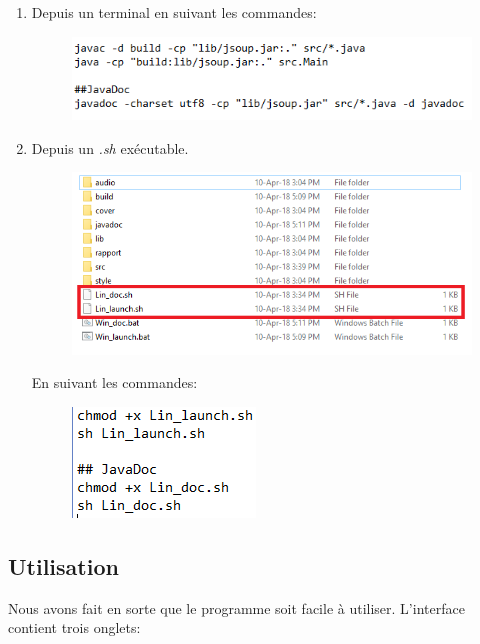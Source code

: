 \documentclass[a4paper,12pt]{report} %
\begin{document}
	\begin{enumerate}
   		\item Depuis un terminal en suivant les commandes:
   			\begin{figure}[ht] 		
				\centering
  				\includegraphics{exe_terminal}
			\end{figure}
			
   		\item Depuis un \textit{.sh} exécutable.
   			\begin{figure}[ht] 		
				\centering
  				\includegraphics[scale=0.7]{sh}
			\end{figure} 
			
			En suivant les commandes: 
			\begin{figure}[ht] 		
				\centering
  				\includegraphics{Lin}
			\end{figure} 
	\end{enumerate}	
	

\newpage
\subsection{Utilisation}
	Nous avons fait en sorte que le programme soit facile à utiliser. L'interface contient trois onglets:
	
\end{document}
